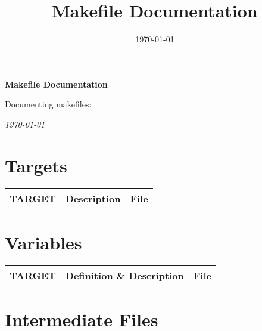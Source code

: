 \documentclass[oneside,11pt]{memoir}
\title{Makefile Documentation}
\date{\today}
\author{}
\begin{document}
	
	\begin{center}
		{\Huge \textbf{Makefile Documentation}}
		
		{\large Documenting makefiles: \texttt{} }
		
		\textit{\today}
	\end{center}
	
	\tableofcontents
	
	\section{Targets}
	
	\begin{tabularx}{\textwidth}{>{\ttfamily}l X >{\ttfamily}l}
		\toprule
		\textbf{TARGET} & \textbf{Description} & \textbf{File} \\
		\midrule 
		
		
		
		\bottomrule
	\end{tabularx}
	
	
	\section{Variables}
			
	\begin{tabularx}{\textwidth}{>{\ttfamily}l X >{\ttfamily}l}
		\toprule
		\textbf{TARGET} & \textbf{Definition \& Description} & \textbf{File} \\
		\midrule 
		
		
		
		\bottomrule
	\end{tabularx}
	
	
	\section{Intermediate Files}

	\begin{description}
		
				
		
	\end{description}
	
\end{document}
